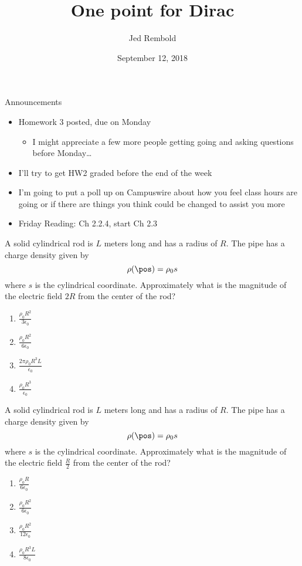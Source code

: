 \documentclass[pdf,aspectratio=169]{beamer}
\title{One point for Dirac}
\date{September 12, 2018}
\author{Jed Rembold}
\begin{document}
\renewcommand{\theenumi}{\Alph{enumi}}

\begin{frame}{Announcements}
	\begin{itemize}
		\item Homework 3 posted, due on Monday
			\begin{itemize}
				\item I might appreciate a few more people getting going and asking questions before Monday\ldots
			\end{itemize}
		\item I'll try to get HW2 graded before the end of the week
		\item I'm going to put a poll up on Campuswire about how you feel class hours are going or if there are things you think could be changed to assist you more
		\item Friday Reading: Ch 2.2.4, start Ch 2.3
	\end{itemize}
\end{frame}

\begin{frame}{}
	A solid cylindrical rod is $L$ meters long and has a radius of $R$. The pipe has a charge density given by
	\[\rho(\pos) = \rho_0 s\]
	where $s$ is the cylindrical coordinate. Approximately what is the magnitude of the electric field $2R$ from the center of the rod?
	\begin{enumerate}
		\item $\displaystyle \frac{\rho_0 R^2}{3\epsilon_0}$
		\item \alert<2>{$\displaystyle \frac{\rho_0 R^2}{6\epsilon_0}$}
		\item $\displaystyle \frac{2\pi\rho_0R^3 L}{\epsilon_0}$
		\item $\displaystyle \frac{\rho_0 R^3}{\epsilon_0}$
	\end{enumerate}
\end{frame}

\begin{frame}{}
	A solid cylindrical rod is $L$ meters long and has a radius of $R$. The pipe has a charge density given by
	\[\rho(\pos) = \rho_0 s\]
	where $s$ is the cylindrical coordinate. Approximately what is the magnitude of the electric field $\frac{R}{2}$ from the center of the rod?
	\begin{enumerate}
		\item $\displaystyle \frac{\rho_0 R}{6\epsilon_0}$
		\item $\displaystyle \frac{\rho_0 R^2}{6\epsilon_0}$
		\item \alert<2>{$\displaystyle \frac{\rho_0 R^2}{12\epsilon_0}$}
		\item $\displaystyle \frac{\rho_0 R^3 L}{8\epsilon_0}$
	\end{enumerate}
\end{frame}
\end{document}
